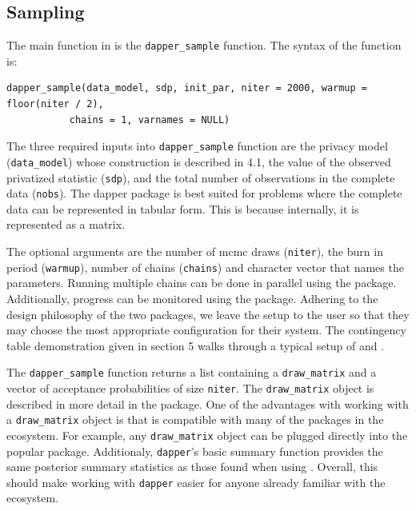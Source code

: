 \hypertarget{sampling}{%
\subsection{Sampling}\label{sampling}}

The main function in  is the \texttt{dapper\_sample} function. The syntax of the function is:

\begin{verbatim}
dapper_sample(data_model, sdp, init_par, niter = 2000, warmup = floor(niter / 2),
           chains = 1, varnames = NULL)
\end{verbatim}

The three required inputs into \texttt{dapper\_sample} function are the privacy model (\texttt{data\_model}) whose construction is described in 4.1, the value
of the observed privatized statistic (\texttt{sdp}), and the total number of observations
in the complete data (\texttt{nobs}). The dapper
package is best suited for problems where the complete data can be represented in
tabular form. This is because internally, it is represented as a matrix.

The optional arguments are the number of mcmc draws (\texttt{niter}), the
burn in period (\texttt{warmup}), number of chains (\texttt{chains}) and character
vector that names the parameters. Running multiple chains can be done in parallel
using the  package. Additionally, progress can be monitored
using the  package. Adhering to the design philosophy
of the two packages, we leave the setup to the user so that they may
choose the most appropriate configuration for their system. The
contingency table demonstration given in section 5 walks
through a typical setup of  and .

The \texttt{dapper\_sample} function returns a list containing
a \texttt{draw\_matrix} and a vector of acceptance probabilities of size \texttt{niter}. The \texttt{draw\_matrix} object is described
in more detail in the  package. One of the advantages with working
with a \texttt{draw\_matrix} object is that is compatible with many of the packages in
the  ecosystem. For example, any \texttt{draw\_matrix} object can be
plugged directly into the popular  package. Additionaly,
\texttt{dapper}'s basic summary function provides the same posterior summary statistics
as those found when using . Overall, this should make working with \texttt{dapper} easier
for anyone already familiar with the  ecosystem.

